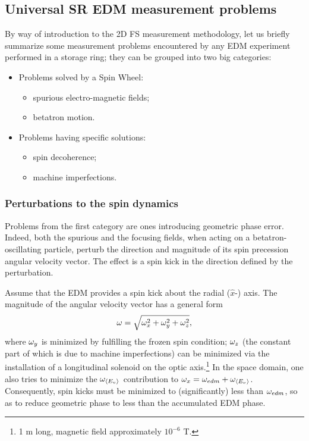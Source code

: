 \subsection{Universal SR EDM measurement problems}\label{sec:FSSREDM:problems}
By way of introduction to the 2D FS measurement methodology, let us briefly summarize some measurement problems
encountered by any EDM experiment performed in a storage ring; they can be grouped into two big categories:
\begin{itemize}
\item Problems solved by a Spin Wheel:
  \begin{itemize}
  \item spurious electro-magnetic fields;
  \item betatron motion.
  \end{itemize}
\item Problems having specific solutions:
  \begin{itemize}
  \item spin decoherence;
  \item machine imperfections.
  \end{itemize}
\end{itemize}

\subsubsection{Perturbations to the spin dynamics}
Problems from the first category are ones introducing geometric phase error. Indeed, both the spurious 
and the focusing fields, when acting on a betatron-oscillating particle, perturb the direction and
magnitude of its spin precession angular velocity vector. The effect is a spin kick in the direction defined
by the perturbation.

Assume that the EDM provides a spin kick about the radial ($\hat x$-) axis. The magnitude of the angular
velocity vector has a general form
\[
\omega = \sqrt{\omega_x^2 + \omega_y^2 + \omega_z^2},
\]
where $\omega_y$ is minimized by fulfilling the frozen spin condition; $\omega_z$ (the constant part of which is
due to machine imperfections) can be minimized via the installation
of a longitudinal solenoid on the optic axis.\footnote{1 m long, magnetic field approximately $10^{-6}$ T.} In the
space domain, one also tries to minimize the $\wimp$ contribution to $\w_x = \wedm + \wimp$. Consequently,
spin kicks must be minimized to (significantly) less than $\omega_{edm}$, so as to reduce geometric phase to
less than the accumulated EDM phase.

